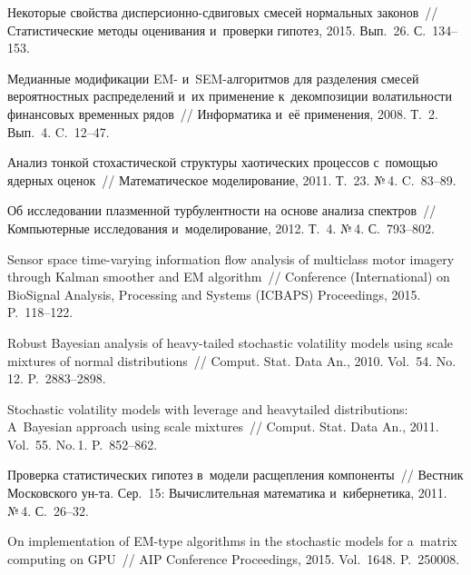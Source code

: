 \begin{multicols}{2}
{{\begin{thebibliography}{99}
Некоторые свойства дис\-пер\-си\-он\-но-сдви\-го\-вых смесей нормальных законов~// 
Статистические методы оценивания и~проверки гипотез, 2015. Вып.~26. С.~134--153.

 Медианные  модификации EM- и~SEM-ал\-го\-рит\-мов
для разделения смесей вероятностных распределений и~их
применение к~декомпозиции волатильности финансовых временных
рядов~// Информатика и~её применения, 2008. Т.~2. Вып.~4. C.~12--47.

 Анализ тонкой стохастической
структуры хаотических процессов с~по\-мощью ядерных оценок~//
Математическое моделирование, 2011. Т.~23. №\,4. C.~83--89.

Об исследовании плазменной турбулентности на основе анализа спектров~// Компьютерные
исследования и~моделирование, 2012. Т.~4. №\,4. С.~793--802.

Sensor space time-varying information flow analysis of multiclass motor imagery 
through Kalman smoother and EM algorithm~// 
Conference (International) on BioSignal Analysis, Processing and Systems (ICBAPS)
Proceedings, 2015. 
P.~118--122.

Robust Bayesian analysis of heavy-tailed stochastic volatility models 
using scale mixtures of normal distributions~// Comput. Stat. 
Data An., 2010. Vol.~54. No.\,12. P.~2883--2898.

Stochastic volatility models with leverage and heavytailed distributions: 
A~Bayesian approach using scale mixtures~// Comput. Stat. 
Data An., 2011. Vol.~55. No.\,1. P.~852--862.

Проверка статистических гипотез в~модели расщепления компоненты~//
Вестник Московского ун-та. Сер.~15: Вычислительная математика и~кибернетика, 2011. 
№\,4. С.~26--32.

On implementation of EM-type algorithms in the stochastic models 
for a~matrix computing on GPU~// AIP Conference Proceedings, 2015. Vol.~1648. P.~250008.



\end{thebibliography}}}
\end{multicols}
